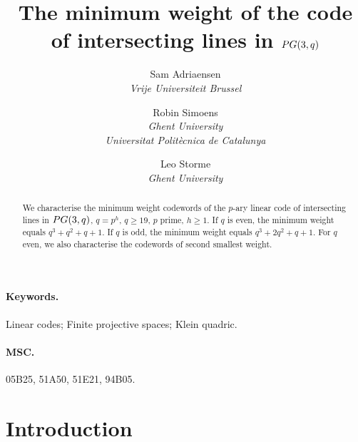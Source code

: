 \documentclass[a4paper]{article}
\title{The minimum weight of the code of intersecting  lines in $\pg(3,q)$}
\author{
 Sam Adriaensen \\ \textit{Vrije Universiteit Brussel} \and
 Robin Simoens \\ \textit{Ghent University} \\ \textit{Universitat Politècnica de Catalunya} \\ \and 
 Leo Storme \\ \textit{Ghent University}
}
\date{}
\theoremstyle{definition}
\newcommand{\pg}{\textnormal{PG}}
\begin{document}
\maketitle

\begin{abstract}
 We characterise the minimum weight codewords of the $p$-ary linear code of intersecting lines in $\pg(3,q)$, $q=p^h$, $q\geq19$, $p$ prime, $h\geq 1$.
 If $q$ is even, the minimum weight equals $q^3+q^2+q+1$. If $q$ is odd, the minimum weight equals $q^3+2q^2+q+1$.
 For $q$ even, we also characterise the codewords of second smallest weight.
\end{abstract}

\paragraph{Keywords.} Linear codes; Finite projective spaces; Klein quadric.

\paragraph{MSC.}
05B25, %
51A50, %
51E21, %
94B05. %


\section{Introduction}
\end{document}

